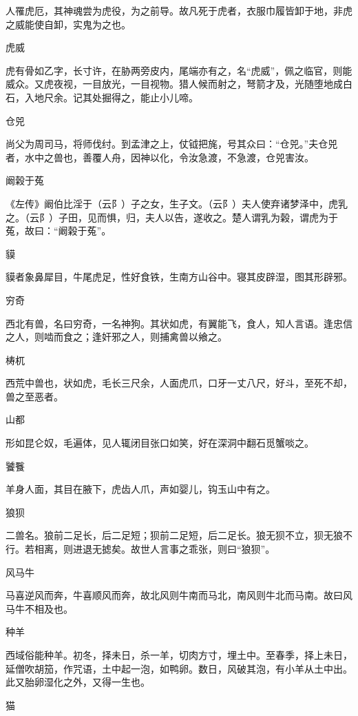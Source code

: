 \documentclass[a4paper,12pt,UTF8,twoside]{ctexbook}
\begin{document}
    人罹虎厄，其神魂尝为虎役，为之前导。故凡死于虎者，衣服巾履皆卸于地，非虎之威能使自卸，实鬼为之也。
    
    虎威
    
    虎有骨如乙字，长寸许，在胁两旁皮内，尾端亦有之，名“虎威”，佩之临官，则能威众。又虎夜视，一目放光，一目视物。猎人候而射之，弩箭才及，光随堕地成白石，入地尺余。记其处掘得之，能止小儿啼。
    
    仓兕
    
    尚父为周司马，将师伐纣。到孟津之上，仗钺把旄，号其众曰：“仓兕。”夫仓兕者，水中之兽也，善覆人舟，因神以化，令汝急渡，不急渡，仓兕害汝。
    
    阚榖于菟
    
    《左传》阚伯比淫于（云阝）子之女，生子文。（云阝）夫人使弃诸梦泽中，虎乳之。（云阝）子田，见而惧，归，夫人以告，遂收之。楚人谓乳为榖，谓虎为于菟，故曰：“阚榖于菟”。
    
    貘
    
    貘者象鼻犀目，牛尾虎足，性好食铁，生南方山谷中。寝其皮辟湿，图其形辟邪。
    
    穷奇
    
    西北有兽，名曰穷奇，一名神狗。其状如虎，有翼能飞，食人，知人言语。逢忠信之人，则啮而食之；逢奸邪之人，则捕禽兽以飨之。
    
    梼杌
    
    西荒中兽也，状如虎，毛长三尺余，人面虎爪，口牙一丈八尺，好斗，至死不却，兽之至恶者。
    
    山都
    
    形如昆仑奴，毛遍体，见人辄闭目张口如笑，好在深洞中翻石觅蟹啖之。
    
    饕餮
    
    羊身人面，其目在腋下，虎齿人爪，声如婴儿，钩玉山中有之。
    
    狼狈
    
    二兽名。狼前二足长，后二足短；狈前二足短，后二足长。狼无狈不立，狈无狼不行。若相离，则进退无摅矣。故世人言事之乖张，则曰“狼狈”。
    
    风马牛
    
    马喜逆风而奔，牛喜顺风而奔，故北风则牛南而马北，南风则牛北而马南。故曰风马牛不相及也。
    
    种羊
    
    西域俗能种羊。初冬，择未日，杀一羊，切肉方寸，埋土中。至春季，择上未日，延僧吹胡笳，作咒语，土中起一泡，如鸭卵。数日，风破其泡，有小羊从土中出。此又胎卵湿化之外，又得一生也。
    
    猫
    
\end{document}
